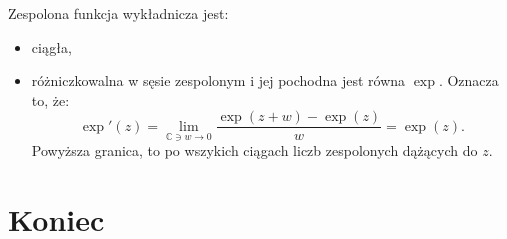 \documentclass{article}
\numberwithin{defi}{section}
\numberwithin{defi}{section}
\newcommand{\C}{\mathbb{C}}
\begin{document}
\begin{twier}{}
    Zespolona funkcja wykładnicza jest: \begin{itemize}
        \item ciągła,
        \item różniczkowalna w sęsie zespolonym i jej pochodna jest równa $\exp$. Oznacza to, że: \begin{equation}
            \exp'(z) = \lim_{\C \ni w \to 0} \frac{\exp(z + w) - \exp(z)}{w} = \exp(z).
        \end{equation} Powyższa granica, to po wszykich ciągach liczb zespolonych dążących do $z$.
    \end{itemize}
\end{twier}



\newpage
\section*{Koniec}
\newpage
\tableofcontents
\end{document}
